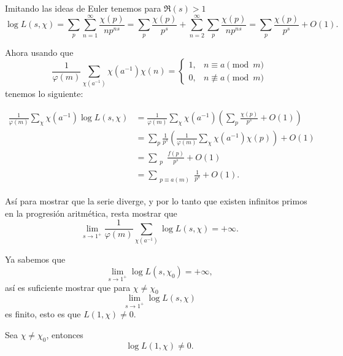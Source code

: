 Imitando las ideas de Euler tenemos para $\Re(s) > 1$
\[
\log L(s, \chi) = \sum_p \sum_{n=1}^{\infty} \frac{\chi(p)}{np^{ns}} = \sum_p \frac{\chi(p)}{p^s} + \sum_{n=2}^{\infty} \sum_p \frac{\chi(p)}{np^{ns}} = \sum_p \frac{\chi(p)}{p^s} + O(1).
\]

Ahora usando que
\[
\frac{1}{\varphi(m)} \sum_{\chi (a^{-1})} \chi(a^{-1}) \chi(n) = 
\begin{cases}
1, & n \equiv a \pmod{m} \\
0, & n \not\equiv a \pmod{m}
\end{cases}
\]
tenemos lo siguiente:

\begin{align*}
    \frac{1}{\varphi(m)} \sum_{\chi} \chi(a^{-1}) \log L(s, \chi)&= \frac{1}{\varphi(m)} \sum_{\chi} \chi(a^{-1})\left(\sum_p \frac{\chi(p)}{p^s} + O(1)\right)\\
    &= \sum_p \frac{1}{p^s} \left( \frac{1}{\varphi(m)} \sum_{\chi} \chi(a^{-1}) \chi(p) \right) + O(1)\\
&= \sum_{\substack{p}} \frac{f(p)}{p^s} + O(1)\\
&=\sum_{\substack{p \equiv a(m)}} \frac{1}{p^s} + O(1)
.\end{align*}

Así para mostrar que la serie diverge, y por lo tanto que existen infinitos primos en la progresión aritmética, resta mostrar que
\[
\lim_{s \to 1^+} \frac{1}{\varphi(m)} \sum_{\chi (a^{-1})} \log L(s, \chi) = +\infty.
\]

Ya sabemos que
\[
\lim_{s \to 1^+} \log L(s, \chi_0) = +\infty,
\]
así es suficiente mostrar que para $\chi \neq \chi_0$
\[
\lim_{s \to 1^+} \log L(s, \chi)
\]
es finito, esto es que $L(1,\chi)\neq 0$.

\begin{theorem}[Dirichlet]
Sea $\chi \neq \chi_0$, entonces \[
\log L(1, \chi) \neq 0.
\]
\end{theorem}

